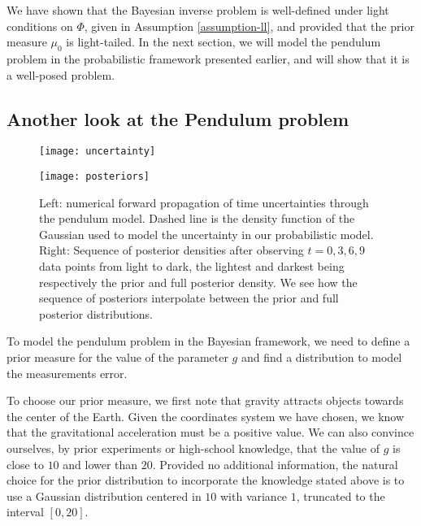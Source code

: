 We have shown that the Bayesian inverse problem is well-defined under light conditions on $\Phi$, given in Assumption \ref{assumption-ll}, and provided that the prior measure $\mu_0$ is light-tailed. In the next section, we will model the pendulum problem in the probabilistic framework presented earlier, and will show that it is a well-posed problem.

\subsection{Another look at the Pendulum problem}

\begin{figure}[t!]
  \begin{minipage}{.5\textwidth}
    \texttt{[image: uncertainty]}
  \end{minipage}
  \begin{minipage}{.5\textwidth}
    \texttt{[image: posteriors]}
  \end{minipage}
  \caption{Left: numerical forward propagation of time uncertainties through the pendulum model. Dashed line is the density function of the Gaussian used to model the uncertainty in our probabilistic model. Right: Sequence of posterior densities after observing $t=0, 3, 6, 9$ data points from light to dark, the lightest and darkest being respectively the prior and full posterior density. We see how the sequence of posteriors interpolate between the prior and full posterior distributions. }
  \label{uncertainty-posteriors}
\end{figure}



To model the pendulum problem in the Bayesian framework, we need to define a prior measure for the value of the parameter $g$ and find a distribution to model the measurements error.

To choose our prior measure, we first note that gravity attracts objects towards the center of the Earth. Given the coordinates system we have chosen, we know that the gravitational acceleration must be a positive value. We can also convince ourselves, by prior experiments or high-school knowledge, that the value of $g$ is close to $10$ and lower than $20$. Provided no additional information, the natural choice for the prior distribution to incorporate the knowledge stated above is to use a Gaussian distribution centered in $10$ with variance $1$, truncated to the interval $[0, 20]$.

